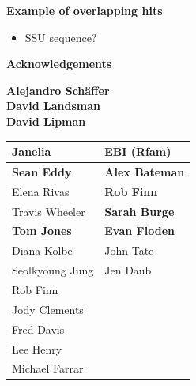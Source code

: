 \documentclass[landscape]{slides}
\begin{document}
\begin{slide}
\begin{center}
\textbf{Example of overlapping hits} \\

\begin{itemize}
\item SSU sequence? 
\end{itemize}
\end{center}

\vfill
\end{slide}
\begin{slide}

\large
\begin{center}
\large{\textbf{Acknowledgements}} \\

\vspace{0.5in}

\textbf{Alejandro Sch\"{a}ffer} \\
\textbf{David Landsman} \\
\textbf{David Lipman}

\vspace{0.5in}

\normalsize
\begin{tabular}{l|l}
\textbf{Janelia} & \textbf{EBI (Rfam)} \\ \hline
{\bf Sean Eddy}     & {\bf Alex Bateman} \\
Elena Rivas         & {\bf Rob Finn} \\
Travis Wheeler      & {\bf Sarah Burge} \\ 
{\bf Tom Jones}     & {\bf Evan Floden} \\
Diana Kolbe         & John Tate \\
Seolkyoung Jung     & Jen Daub \\
Rob Finn            & \\
Jody Clements       & \\
Fred Davis          & \\
Lee Henry           & \\
Michael Farrar      & \\
\end{tabular}


\end{center}
\end{slide}
\end{document}
